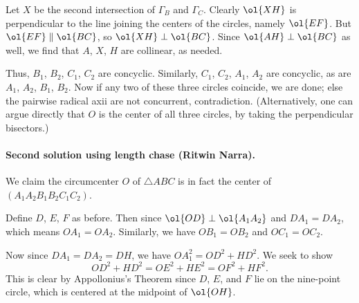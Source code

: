 Let $X$ be the second intersection of $\Gamma_B$ and $\Gamma_C$.
Clearly $\ol{XH}$ is perpendicular to the line
joining the centers of the circles, namely $\ol{EF}$.
But $\ol{EF} \parallel \ol{BC}$, so $\ol{XH} \perp \ol{BC}$.
Since $\ol{AH} \perp \ol{BC}$ as well,
we find that $A$, $X$, $H$ are collinear, as needed.

Thus, $B_1$, $B_2$, $C_1$, $C_2$ are concyclic.
Similarly, $C_1$, $C_2$, $A_1$, $A_2$ are concyclic,
as are $A_1$, $A_2$, $B_1$, $B_2$.
Now if any two of these three circles coincide, we are done;
else the pairwise radical axii are not concurrent, contradiction.
(Alternatively, one can argue directly that $O$ is the center of all
three circles, by taking the perpendicular bisectors.)

\paragraph{Second solution using length chase (Ritwin Narra).}
We claim the circumcenter $O$ of $\triangle ABC$
is in fact the center of $(A_1A_2B_1B_2C_1C_2)$.

Define $D$, $E$, $F$ as before.
Then since $\ol{OD} \perp \ol{A_1A_2}$ and $DA_1 = DA_2$,
which means $OA_1 = OA_2$. Similarly, we have $OB_1 = OB_2$ and $OC_1 = OC_2$.

Now since $DA_1 = DA_2 = DH$, we have $OA_1^2 = OD^2 + HD^2$.
We seek to show
\[ OD^2 + HD^2 = OE^2 + HE^2 = OF^2 + HF^2. \]
This is clear by Appollonius's Theorem
since $D$, $E$, and $F$ lie on the nine-point circle,
which is centered at the midpoint of $\ol{OH}$.
